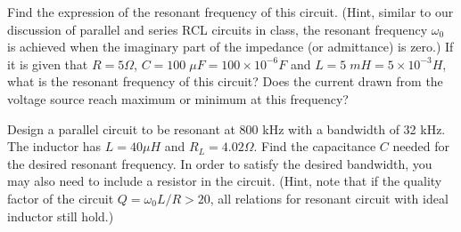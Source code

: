 Find the expression of the resonant frequency of this circuit. (Hint,
similar to our discussion of parallel and series RCL circuits in class, 
the resonant frequency $\omega_0$ is achieved when the imaginary part of
the impedance (or admittance) is zero.) If it is given that $R=5\Omega$,
$C=100\;\mu F=100\times 10^{-6}F$ and $L=5\; mH=5\times 10^{-3}H$, what
is the resonant frequency of this circuit? Does the current drawn from 
the voltage source reach maximum or minimum at this frequency?

% 

%
%
% 


\item Design a parallel circuit to be resonant at 800 kHz with a bandwidth
of 32 kHz. The inductor has $L=40 \mu H$ and $R_L=4.02 \Omega$. Find the
capacitance $C$ needed for the desired resonant frequency. In order to
satisfy the desired bandwidth, you may also need to include a resistor 
in the circuit. (Hint, note that if the quality factor of the circuit
$Q=\omega_0 L/R > 20$, all relations for resonant circuit with ideal
inductor still hold.)


